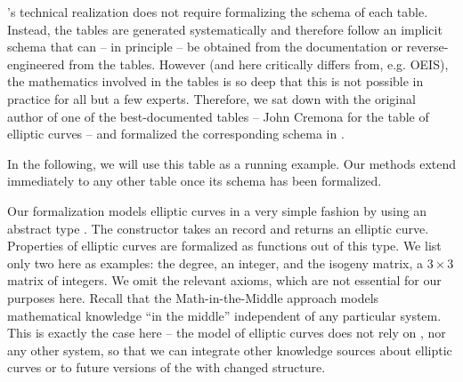 \lmfdb's technical realization does not require formalizing the schema of each table. 
Instead, the tables are generated systematically and therefore follow an implicit schema that can -- in principle -- be obtained from the documentation or reverse-engineered from the tables. 
However (and here \lmfdb critically differs from, e.g. OEIS), the mathematics involved in the tables is so deep that this is not possible in practice for all but a few experts. 
Therefore, we sat down with the original author of one of the best-documented tables -- John Cremona for the table of elliptic curves -- and
formalized the corresponding schema in \ommt. 

In the following, we will use this table as a running example.
Our methods extend immediately to any other table once its schema has been formalized.

Our formalization models elliptic curves in a very simple fashion by using an abstract type . 
The constructor  takes an \mmt record and returns an elliptic curve. 
Properties of elliptic curves are formalized as functions out of this type.
We list only two here as examples: the \textsf{degree}, an integer, and the \textsf{isogeny matrix}, a $3 \times 3$ matrix of integers.
We omit the relevant axioms, which are not essential for our purposes here.
Recall that the Math-in-the-Middle approach models mathematical knowledge ``in the middle'' independent of any particular system.
This is exactly the case here -- the model of elliptic curves does not rely on \lmfdb, nor any other system, so that we can integrate other knowledge sources about elliptic curves or to future versions of the \lmfdb with changed structure. 



